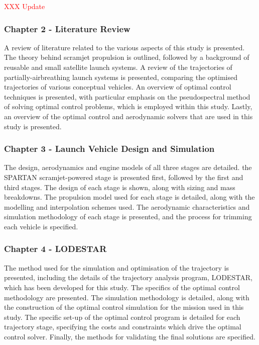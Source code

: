     \textcolor{red}{XXX Update}

    \subsubsection*{Chapter 2 - Literature Review}

      A review of literature related to the various aspects of this study is presented. The theory behind scramjet propulsion is outlined, followed by a background of reusable and small satellite launch systems. A review of the trajectories of partially-airbreathing launch systems is presented, comparing the optimised trajectories of various conceptual vehicles. An overview of optimal control techniques is presented, with particular emphasis on the pseudospectral method of solving optimal control problems, which is employed within this study. Lastly, an overview of the optimal control and aerodynamic solvers that are used in this study is presented.
      

    \subsubsection*{Chapter 3 - Launch Vehicle Design and Simulation}

      The design, aerodynamics and engine models of all three stages are detailed. the SPARTAN scramjet-powered stage is presented first, followed by the first and third stages. The design of each stage is shown, along with sizing and mass breakdowns. The propulsion model used for each stage is detailed, along with the modelling and interpolation schemes used. The aerodynamic characteristics and simulation methodology of each stage is presented, and the process for trimming each vehicle is specified. 
      
      
      \subsubsection*{Chapter 4 - LODESTAR}
      
      The method used for the simulation and optimisation of the trajectory is presented, including the details of the trajectory analysis program, LODESTAR, which has been developed for this study. The specifics of the optimal control methodology are presented. The simulation methodology is detailed, along with the construction of the optimal control simulation for the mission used in this study. The specific set-up of the optimal control program is detailed for each trajectory stage, specifying the costs and constraints which drive the optimal control solver. Finally, the methods for validating the final solutions are specified.
      
